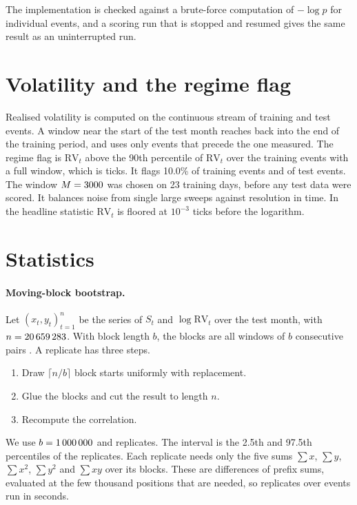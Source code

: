 \documentclass[11pt]{article}
\newcommand{\RV}{\mathrm{RV}}
\begin{document}
The implementation is checked against a brute-force computation of $-\log p$ for individual events, and a scoring run that is stopped and resumed gives the same result as an uninterrupted run.

\section{Volatility and the regime flag}\label{app:vol}

Realised volatility is computed on the continuous stream of training and test events.
A window near the start of the test month reaches back into the end of the training period, and uses only events that precede the one measured.
The regime flag is $\RV_t$ above the 90th percentile of $\RV_t$ over the training events with a full window, which is \Thr{} ticks.
It flags 10.0\% of training events and \FlagShare{} of test events.
The window $M=3000{}$ was chosen on 23 training days, before any test data were scored.
It balances noise from single large sweeps against resolution in time.
In the headline statistic $\RV_t$ is floored at $10^{-3}$ ticks before the logarithm.

\section{Statistics}\label{app:stats}

\paragraph{Moving-block bootstrap.}
Let $(x_t,y_t)_{t=1}^n$ be the series of $S_t$ and $\log\RV_t$ over the test month, with $n=20\,659\,283{}$.
With block length $b$, the blocks are all windows of $b$ consecutive pairs \citep{kunsch1989,liu1992}.
A replicate has three steps.
\begin{enumerate}
  \item Draw $\lceil n/b\rceil$ block starts uniformly with replacement.
  \item Glue the blocks and cut the result to length $n$.
  \item Recompute the correlation.
\end{enumerate}
We use $b=1\,000\,000{}$ and \NBoot{} replicates.
The interval is the 2.5th and 97.5th percentiles of the replicates.
Each replicate needs only the five sums $\sum x$, $\sum y$, $\sum x^2$, $\sum y^2$ and $\sum xy$ over its blocks.
These are differences of prefix sums, evaluated at the few thousand positions that are needed, so \NBoot{} replicates over \NEval{} events run in seconds.
\end{document}
